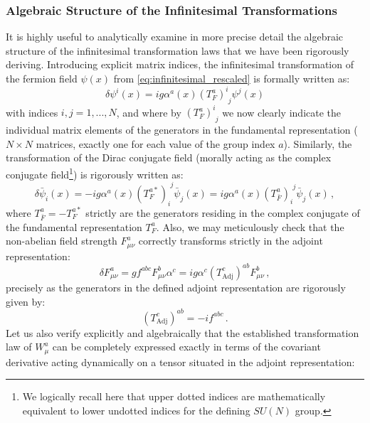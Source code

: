 \subsubsection{Algebraic Structure of the Infinitesimal Transformations}

It is highly useful to analytically examine in more precise detail the algebraic structure of the infinitesimal transformation laws that we have been rigorously deriving. Introducing explicit matrix indices, the infinitesimal transformation of the fermion field \(\psi(x)\) from \eqref{eq:infinitesimal_rescaled} is formally written as:
\begin{equation} \label{eq:infinitesimal_psi_indices}
    \delta\psi^i(x) = ig\alpha^a(x)(T_F^a)^i_{\phantom{i}j}\psi^j(x)
\end{equation}
with indices \(i, j = 1, ..., N\), and where by \((T_F^a)^i_{\phantom{i}j}\) we now clearly indicate the individual matrix elements of the generators in the fundamental representation (\(N \times N\) matrices, exactly one for each value of the group index \(a\)). Similarly, the transformation of the Dirac conjugate field (morally acting as the complex conjugate field\footnote{We logically recall here that upper dotted indices are mathematically equivalent to lower undotted indices for the defining \(SU(N)\) group.}) is rigorously written as:
\begin{equation} \label{eq:infinitesimal_psibar_indices}
    \delta\bar{\psi}_i(x) = -ig\alpha^a(x)(T_F^{a*})_{i}^{\phantom{i}j} \bar{\psi}_j(x) = ig\alpha^a(x)(T_{\bar{F}}^a)_{i}^{\phantom{i}j} \bar{\psi}_j(x) \, ,
\end{equation}
where \(T_{\bar{F}}^a = -T_F^{a*}\) strictly are the generators residing in the complex conjugate of the fundamental representation \(T_F^a\). Also, we may meticulously check that the non-abelian field strength \(F_{\mu\nu}^a\) correctly transforms strictly in the adjoint representation:
\begin{equation} \label{eq:f_adjoint_transform}
    \delta F_{\mu\nu}^a = g f^{abc}F_{\mu\nu}^b \alpha^c = ig\alpha^c(T_{\mathrm{Adj}}^c)^{ab}F_{\mu\nu}^b \, ,
\end{equation}
precisely as the generators in the defined adjoint representation are rigorously given by:
\begin{equation} \label{eq:adjoint_generators}
    (T_{\mathrm{Adj}}^c)^{ab} = -if^{abc} \, .
\end{equation}
Let us also verify explicitly and algebraically that the established transformation law of \(W_\mu^a\) can be completely expressed exactly in terms of the covariant derivative acting dynamically on a tensor situated in the adjoint representation:
